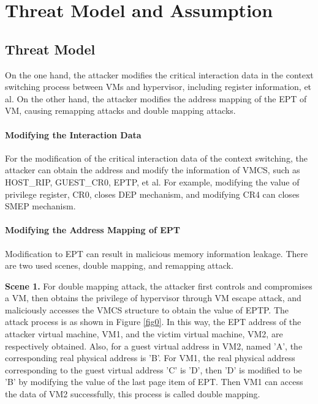 \documentclass[conference]{IEEEtran}
\begin{document}


\section{Threat Model and Assumption}\label{sec:threat}



\subsection{Threat Model} \label {threat}



On the one hand, the attacker modifies the critical interaction data in the context switching process between VMs and hypervisor, including register information, et al. On the other hand, the attacker modifies the address mapping of the EPT of VM, causing remapping attacks and double mapping attacks.

\paragraph{Modifying the Interaction Data}
For the modification of the critical interaction data of the context switching, the attacker can obtain the address 
and modify the information of VMCS, such as HOST\_RIP, GUEST\_CR0, EPTP, et al. For example,
modifying the value of privilege register, CR0, closes DEP mechanism, and modifying CR4 can closes SMEP mechanism.

\paragraph{Modifying the Address Mapping of EPT}
Modification to EPT can result in malicious memory information leakage. There are two used scenes, double mapping, and remapping attack.

\textbf{Scene 1.} 
    For double mapping attack, the attacker first controls and compromises a VM, then obtains the privilege of hypervisor through VM escape attack, and maliciously accesses the VMCS structure to obtain the value of EPTP. The attack process is as shown in Figure \ref{fig0}. In this way, the EPT address of the attacker virtual machine, VM1, and the victim virtual machine, VM2, are respectively obtained. Also, for a guest virtual address in VM2, named 'A', the corresponding real physical address is 'B'. For VM1, the real physical address corresponding to the guest virtual address 'C' is 'D', then 'D' is modified to be 'B' by modifying the value of the last page item of EPT. Then VM1 can access the data of VM2 successfully, this process is called double mapping.
\end{document}
